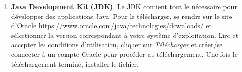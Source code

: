 \begin{enumerate}
    \item \textbf{Java Development Kit (JDK)}. Le JDK contient tout le nécessaire pour développer des applications Java. Pour le télécharger, se rendre sur le site d'Oracle \url{https://www.oracle.com/java/technologies/downloads/} et sélectionner la version correspondant à votre système d'exploitation. Lire et accepter les conditions d'utilisation, cliquer sur \textit{Télécharger} et créer/se connecter à un compte Oracle pour procéder au téléchargement. Une fois le téléchargement terminé, installer le fichier.
\end{enumerate}

